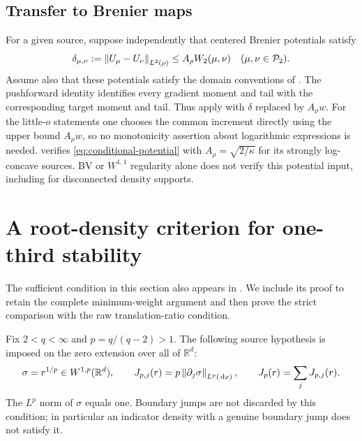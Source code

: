 \documentclass[11pt]{article}
\numberwithin{equation}{section}
\theoremstyle{remark}\newtheorem{remark}[theorem]{Remark}
\newcommand{\R}{\mathbb R}\newcommand{\E}{\mathbb E}
\newcommand{\Prob}{\mathcal P}\newcommand{\dd}{\,\mathrm d}
\begin{document}
\subsection{Transfer to Brenier maps}
For a given source, suppose independently that centered Brenier potentials satisfy
\begin{equation}\label{eq:conditional-potential}
 \delta_{\mu,\nu}:=\norm{U_\mu-U_\nu}_{L^2(\rho)}
 \le A_\rho W_2(\mu,\nu)
 \quad(\mu,\nu\in\Prob_2).
\end{equation}
Assume also that these potentials satisfy the domain conventions of . The pushforward identity identifies every gradient moment and tail with the corresponding target moment and tail. Thus  apply with $\delta$ replaced by $A_\rho w$. For the little-$o$ statements one chooses the common increment directly using the upper bound $A_\rho w$, so no monotonicity assertion about logarithmic expressions is needed.  verifies \eqref{eq:conditional-potential} with $A_\rho=\sqrt{2/\kappa}$ for its strongly log-concave sources. BV or $W^{1,1}$ regularity alone does not verify this potential input, including for disconnected density supports.

\section{A root-density criterion for one-third stability}\label{sec:fisher}
The sufficient condition in this section also appears in \cite[Theorem~1.2 and Section~2]{OverlapManuscriptV1}. We include its proof to retain the complete minimum-weight argument and then prove the strict comparison with the raw translation-ratio condition.

Fix $2<q<\infty$ and $p=q/(q-2)>1$. The following source hypothesis is imposed on the zero extension over all of $\R^d$:
\begin{equation}\label{eq:root-condition}
 \sigma=r^{1/p}\in W^{1,p}(\R^d),\qquad
 J_{p,j}(r)=p\norm{\partial_j\sigma}_{L^p(\dd x)},\qquad
 J_p(r)=\sum_jJ_{p,j}(r).
\end{equation}
The $L^p$ norm of $\sigma$ equals one. Boundary jumps are not discarded by this condition; in particular an indicator density with a genuine boundary jump does not satisfy it.
\end{document}
